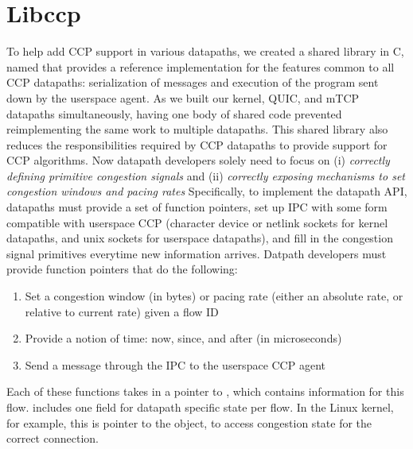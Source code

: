 \section{Libccp}

To help add CCP support in various datapaths, we created a shared library in C, named \libccp that provides a reference implementation for the features common to all CCP datapaths: serialization of messages and execution of the program sent down by the userspace agent.
As we built our kernel, QUIC, and mTCP datapaths simultaneously, having one body of shared code prevented reimplementing the same work to multiple datapaths.
This shared library also reduces the responsibilities required by CCP datapaths to provide support for CCP algorithms.
Now datapath developers solely need to focus on (i) \textit{correctly defining primitive congestion signals} and (ii) \textit{correctly exposing mechanisms to set congestion windows and pacing rates}
Specifically, to implement the datapath API, datapaths must provide a set of function pointers, set up IPC with some form compatible with userspace CCP (character device or netlink sockets for kernel datapaths, and unix sockets for userspace datapaths), and fill in the congestion signal primitives everytime new information arrives.
Datpath developers must provide function pointers that do the following:
\begin{enumerate}
    \item Set a congestion window (in bytes)  or pacing rate (either an absolute rate, or relative to current rate) given a flow ID
    \item Provide a notion of time: now, since, and after (in microseconds)
    \item Send a message through the IPC to the userspace CCP agent
\end{enumerate}
Each of these functions takes in a pointer to , which contains information for this flow.  includes one field for datapath specific state per flow. In the Linux kernel, for example, this is pointer to the  object, to access congestion state for the correct connection.

